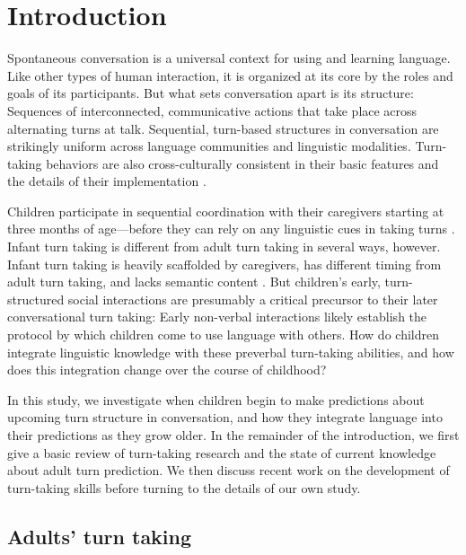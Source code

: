 \documentclass[authoryear, 12pt]{elsarticle}
\begin{document}
\linenumbers

\section{Introduction}
\label{sec:intro}

Spontaneous conversation is a universal context for using and learning language. Like other types of human interaction, it is organized at its core by the roles and goals of its participants. But what sets conversation apart is its structure: Sequences of interconnected, communicative actions that take place across alternating turns at talk. Sequential, turn-based structures in conversation are strikingly uniform across language communities and linguistic modalities. Turn-taking behaviors are also cross-culturally consistent in their basic features and the details of their implementation \citep{de-vos2015, dingemanse2013, stivers2009}. 

Children participate in sequential coordination with their caregivers starting at three months of age---before they can rely on any linguistic cues in taking turns \citep[see, among others, ][]{bateson1975, hilbrink2015, jaffe2001, snow1977}. Infant turn taking is different from adult turn taking in several ways, however. Infant turn taking is heavily scaffolded by caregivers, has different timing from adult turn taking, and lacks semantic content \citep{hilbrink2015, jaffe2001}. But children's early, turn-structured social interactions are presumably a critical precursor to their later conversational turn taking: Early non-verbal interactions likely establish the protocol by which children come to use language with others. How do children integrate linguistic knowledge with these preverbal turn-taking abilities, and how does this integration change over the course of childhood? 

In this study, we investigate when children begin to make predictions about upcoming turn structure in conversation, and how they integrate language into their predictions as they grow older. In the remainder of the introduction, we first give a basic review of turn-taking research and the state of current knowledge about adult turn prediction. We then discuss recent work on the development of turn-taking skills before turning to the details of our own study.

\subsection{Adults' turn taking}
\end{document}
